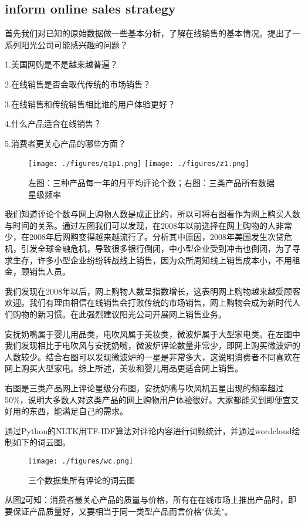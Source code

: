 \documentclass[UTF8]{article}
\begin{document}
\subsection{inform online sales strategy}
首先我们对已知的原始数据做一些基本分析，了解在线销售的基本情况。提出了一系列阳光公司可能感兴趣的问题？

1.美国网购是不是越来越普遍？

2.在线销售是否会取代传统的市场销售？

3.在线销售和传统销售相比谁的用户体验更好？

4.什么产品适合在线销售？

5.消费者更关心产品的哪些方面？

\begin{figure}[h]
	\texttt{[image: ./figures/q1p1.png]}
	\texttt{[image: ./figures/z1.png]}
	\caption{左图：三种产品每一年的月平均评论个数；右图：三类产品所有数据星级频率} \label{z1_q1p1}
\end{figure}

我们知道评论个数与网上购物人数是成正比的，所以可将右图看作为网上购买人数与时间的关系。通过左图我们可以发现，在2008年以前选择在网上购物的人非常少，在2008年后网购变得越来越流行了。分析其中原因，2008年美国发生次贷危机，引发全球金融危机，导致很多银行倒闭，中小型企业受到冲击也倒闭，为了寻求生存，许多小型企业纷纷转战线上销售，因为众所周知线上销售成本小，不用租金，顾销售人员。

我们发现在2008年以后，网上购物人数呈指数增长，这表明网上购物越来越受顾客欢迎。我们有理由相信在线销售会打败传统的市场销售，网上购物会成为新时代人们购物的新习惯。在此强烈建议阳光公司开展网上销售业务。

安抚奶嘴属于婴儿用品类，电吹风属于美妆类，微波炉属于大型家电类。在左图中我们发现相比于电吹风与安抚奶嘴，微波炉评论数量非常少，即网上购买微波炉的人数较少。结合右图可以发现微波炉的一星是非常多大，这说明消费者不同喜欢在网上购买大型家电。综上所述，美妆和婴儿用品更适合网上销售。

右图是三类产品网上评论星级分布图，安抚奶嘴与吹风机五星出现的频率超过50\%，说明大多数人对这类产品的网上购物用户体验很好。大家都能买到即便宜又好用的东西，能满足自己的需求。

通过Python的NLTK用TF-IDF算法对评论内容进行词频统计，并通过wordcloud绘制如下的词云图。

\begin{figure}[H]
	\centering
	\texttt{[image: ./figures/wc.png]}
	\caption{三个数据集所有评论的词云图} \label{wordCloud}
\end{figure}
从图\ref{wordCloud}可知：消费者最关心产品的质量与价格，所有在在线市场上推出产品时，即要保证产品质量好，又要相当于同一类型产品而言价格"优美"。
\end{document}
